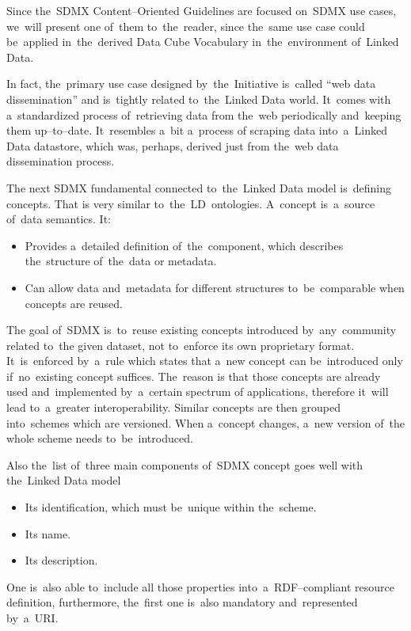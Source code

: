 Since the~SDMX Content--Oriented Guidelines are focused on~SDMX use cases, we~will present
one of~them to~the~reader, since the~same use case could be~applied in~the~derived Data Cube
Vocabulary in~the~environment of~Linked Data.

In fact, the~primary use case designed by~the~Initiative is~called “web data dissemination”
and is~tightly related to~the~Linked Data world. It~comes with a~standardized process of~retrieving
data from the~web periodically and~keeping them up--to--date. It~resembles a~bit a~process
of scraping data into~a~Linked Data datastore, which was, perhaps, derived just from the~web
data dissemination process.

The next SDMX fundamental connected to~the~Linked Data model is~defining concepts. That is
very similar to~the~LD~ontologies. A~concept is~a~source of~data semantics. It:

\begin{itemize}
\item Provides a~detailed definition of~the~component, which describes the~structure of~the~data or
metadata.
\item Can allow data and~metadata for different structures to~be~comparable when concepts are reused.
\end{itemize}

The goal of~SDMX is~to~reuse existing concepts introduced by~any~community related to~the
given dataset, not to~enforce its own proprietary format. It~is~enforced by~a~rule which states
that a~new concept can be~introduced only if~no~existing concept suffices. The~reason
is that those concepts are already used and~implemented by~a~certain spectrum of
applications, therefore it~will lead to~a~greater interoperability. Similar concepts are then
grouped into~schemes which are versioned. When a~concept changes, a~new version of~the
whole scheme needs to~be~introduced.

Also the~list of~three main components of~SDMX concept goes well with the~Linked Data model

\begin{itemize}
\item Its identification, which must be~unique within the~scheme.
\item Its name.
\item Its description.
\end{itemize}

One is~also able to~include all those properties into~a~RDF--compliant resource definition,
furthermore, the~first one is~also mandatory and~represented by~a~URI.

